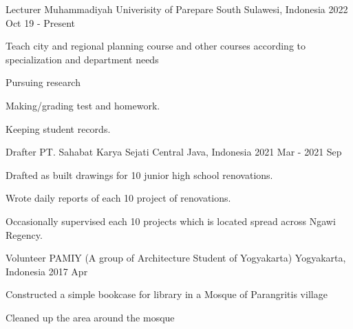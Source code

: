 

\begin{cventries}

  \cventry
    {Lecturer} %
    {Muhammadiyah Univerisity of Parepare} %
    {South Sulawesi, Indonesia} %
    {2022 Oct 19  - Present} %
    {
      \begin{cvitems} %
      \item{Teach city and regional planning course and other courses according to specialization and department needs}
      \item{Pursuing research}
        \item {Making/grading test and homework.}
        \item{Keeping student records.}
      \end{cvitems}
    }
  \cventry
    {Drafter} %
    {PT. Sahabat Karya Sejati} %
    {Central Java, Indonesia} %
    {2021 Mar - 2021 Sep} %
    {
      \begin{cvitems} %
        \item {Drafted as built drawings for 10 junior high school renovations.}
        \item{Wrote daily reports of each 10 project of renovations.}
        \item{Occasionally supervised each 10 projects which is located spread across Ngawi Regency.}
      \end{cvitems}
    }

  \cventry
    {Volunteer} %
    {PAMIY (A group of Architecture Student of Yogyakarta)} %
    {Yogyakarta, Indonesia} %
    {2017 Apr} %
    {
      \begin{cvitems} %
        \item {Constructed a simple bookcase for library in a Mosque of Parangritis village }
        \item{Cleaned up the area around the mosque}
      \end{cvitems}
    }


\end{cventries}
